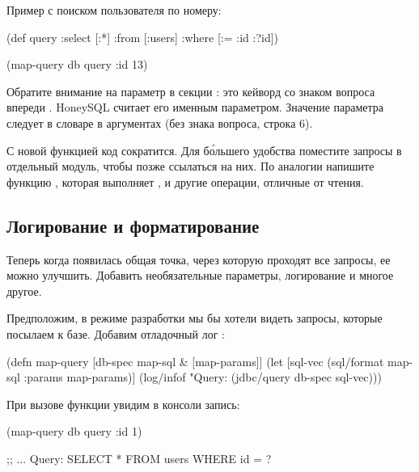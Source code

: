 Пример с поиском пользователя по номеру:

\begin{english}
  \begin{clojure}
(def query
  {:select [:*]
   :from [:users]
   :where [:= :id :?id]})

(map-query db query {:id 13})
  \end{clojure}
\end{english}

Обратите внимание на параметр  в секции : это кейворд со знаком вопроса впереди . HoneySQL считает его именным параметром. Значение параметра следует в словаре  в аргументах  (без знака вопроса, строка 6).

С новой функцией код сократится. Для б\'{о}льшего удобства поместите запросы в отдельный модуль, чтобы позже ссылаться на них. По аналогии напишите функцию , которая выполняет ,  и другие операции, отличные от чтения.

\subsection{Логирование и форматирование}

Теперь когда появилась общая точка, через которую проходят все запросы, ее можно улучшить. Добавить необязательные параметры, логирование и многое другое.

Предположим, в режиме разработки мы бы хотели видеть запросы, которые посылаем к базе. Добавим отладочный лог :

\begin{english}
  \begin{clojure/lines}
(defn map-query [db-spec map-sql & [map-params]]
  (let [sql-vec
        (sql/format map-sql {:params map-params})]
    (log/infof "Query: %
    (jdbc/query db-spec sql-vec)))
  \end{clojure/lines}
\end{english}

При вызове функции  увидим в консоли запись:

\begin{english}
  \begin{clojure}
(map-query db query {:id 1})

;; ... Query: SELECT * FROM users WHERE id = ?
  \end{clojure}
\end{english}

